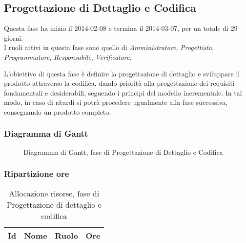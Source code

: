 	\pagebreak
	\subsection{Progettazione di Dettaglio e Codifica}
	 
Questa fase ha inizio il 2014-02-08 e termina il 2014-03-07, per un totale di 29  giorni. \\
I ruoli attivi in questa fase sono quello di \textit{Amministratore}, \textit{Progettista}, \textit{Programmatore}, \textit{Responsabile}, \textit{Verificatore}.

L'obiettivo di questa fase è definire la progettazione di dettaglio e sviluppare il prodotto attraverso la codifica, dando priorità alla progettazione dei requisiti fondamentali e desiderabili, seguendo i principi del modello incrementale.
In tal modo, in caso di ritardi si potrà procedere ugualmente alla fase successiva, consegnando un prodotto completo.

\subsubsection{Diagramma di Gantt}

\begin{figure}[H]
\centering
\scalebox{0.71}{%

	

}
\caption{Diagramma di Gantt, fase di Progettazione di Dettaglio e Codifica}
\end{figure}

\subsubsection{Ripartizione ore}

\begin{table}[H]
\begin{adjustwidth}{-4cm}{-4cm}
	\centering
	\begin{tabular}{ l l l c  }
	\hline
	\multicolumn{1}{c}{\textbf{Id}} & 
	\multicolumn{1}{c}{\textbf{Nome}} & 
	\multicolumn{1}{c}{\textbf{Ruolo}}& 
	\multicolumn{1}{c}{\textbf{Ore}} \\
	\hline
	
		
	
	\end{tabular}
	\caption{Allocazione risorse, fase di Progettazione di dettaglio e codifica}
\end{adjustwidth}
\end{table}	
	
